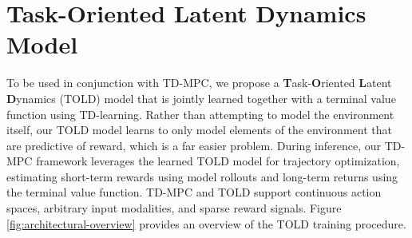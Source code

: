 \documentclass{article}
\begin{document}
\section{Task-Oriented Latent Dynamics Model}
\label{sec:latent-dynamics-model}
\vspace{-0.05in}
To be used in conjunction with TD-MPC, we propose a \textbf{T}ask-\textbf{O}riented \textbf{L}atent \textbf{D}ynamics (TOLD) model that is jointly learned together with a terminal value function using TD-learning. Rather than attempting to model the environment itself, our TOLD model learns to only model elements of the environment that are predictive of reward, which is a far easier problem. During inference, our TD-MPC framework leverages the learned TOLD model for trajectory optimization, estimating short-term rewards using model rollouts and long-term returns using the terminal value function. TD-MPC and TOLD support continuous action spaces, arbitrary input modalities, and sparse reward signals. Figure \ref{fig:architectural-overview} provides an overview of the TOLD training procedure.
\end{document}

